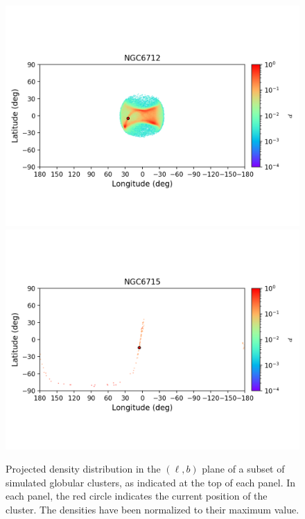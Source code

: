 \begin{figure}
\begin{center}
                \includegraphics[clip=true, trim = 0mm 20mm 0mm 10mm, width=1\columnwidth]{images/error_plots_NGC6712.png}
                \includegraphics[clip=true, trim = 0mm 20mm 0mm 10mm, width=1\columnwidth]{images/error_plots_NGC6715.png}
            \end{center}
            \caption[]{Projected density distribution in the $(\ell, b)$ plane of a subset of simulated globular clusters, as indicated at the top of each panel. In each panel, the red circle indicates the current position of the cluster. The densities have been normalized to their maximum value.}\label{stream14}
        \end{figure}
        
